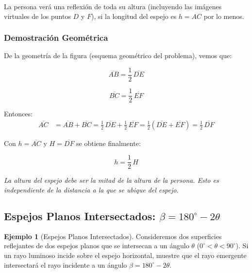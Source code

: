 \documentclass[12pt, a4paper]{article}
\theoremstyle{definition}
\newtheorem{ejemplo}{Ejemplo}[section]
\newcommand{\nota}[1]{\medskip\noindent\colorbox{grisclaro}{\parbox{0.95\linewidth}{\textit{#1}}}\medskip}
\begin{document}
La persona verá una reflexión de toda su altura (incluyendo las imágenes virtuales de los puntos
\(D\) y \(F\)), si la longitud del espejo es \(h = AC\) por lo menos.

\subsubsection*{Demostración Geométrica}

De la geometría de la figura (esquema geométrico del problema), vemos que:

\begin{equation}
  \overline{AB} = \frac{1}{2}\,\overline{DE}
  \label{eq:AB}
\end{equation}

\begin{equation}
  \overline{BC} = \frac{1}{2}\,\overline{EF}
  \label{eq:BC}
\end{equation}

Entonces:
\begin{align}
  \overline{AC} &= \overline{AB} + \overline{BC} = \frac{1}{2}\,\overline{DE} +
                   \frac{1}{2}\,\overline{EF} = \frac{1}{2}\left(\overline{DE} +
                   \overline{EF}\right) = \frac{1}{2}\,\overline{DF}
  \label{eq:AC}
\end{align}

Con \(h = \overline{AC}\) y \(H = \overline{DF}\) se obtiene finalmente:

\begin{equation}
  \boxed{h = \frac{1}{2}\,H}
  \label{eq:h_espejo}
\end{equation}

\nota{La altura del espejo debe ser la mitad de la altura de la persona. Esto es
independiente de la distancia a la que se ubique del espejo.}

\subsection{Espejos Planos Intersectados: \(\beta = 180^{\circ} - 2\theta\)}
\label{sec:espejos_intersectados}

\begin{ejemplo}[Espejos Planos Intersectados]
Consideremos dos superficies reflejantes de dos espejos planos que se intersecan a un ángulo
\(\theta\) (\(0^{\circ} < \theta < 90^{\circ}\)). Si un rayo luminoso incide sobre el espejo horizontal,
muestre que el rayo emergente intersectará el rayo incidente a un ángulo
\(\beta = 180^{\circ} - 2\theta\).
\end{ejemplo}
\end{document}
